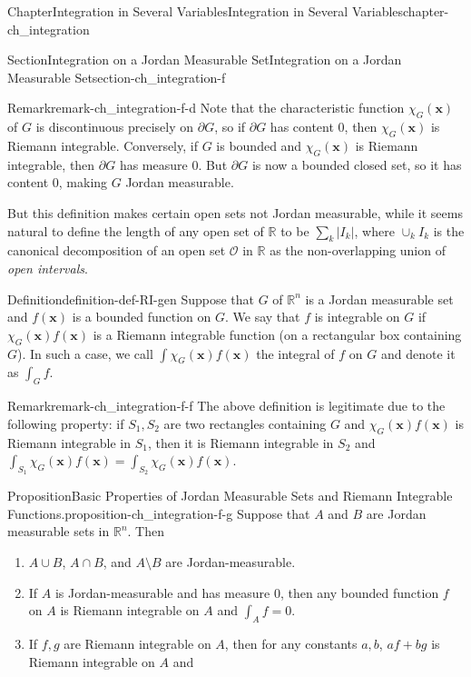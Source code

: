 \documentclass[oneside,10pt,]{book}
\numberwithin{equation}{section}
\newcommand{\bx}{\mathbf{x}}
\newcommand{\bbR}{\mathbb{R}}
\begin{document}
\begin{chapterptx}{Chapter}{Integration in Several Variables}{}{Integration in Several Variables}{}{}{chapter-ch_integration}
\begin{sectionptx}{Section}{Integration on a Jordan Measurable Set}{}{Integration on a Jordan Measurable Set}{}{}{section-ch_integration-f}
\begin{remark}{Remark}{}{remark-ch_integration-f-d}
Note that the characteristic function \(\chi_{G}(\bx)\) of \(G\) is discontinuous precisely on \(\partial G\), so if \(\partial G\) has content \(0\), then \(\chi_{G}(\bx)\) is Riemann integrable. Conversely, if  \(G\) is bounded and \(\chi_{G}(\bx)\) is Riemann integrable, then \(\partial G\) has measure \(0\). But \(\partial G\) is now a bounded closed set, so it has content \(0\), making \(G\) Jordan measurable.%
\par
But this definition makes certain open sets not Jordan measurable, while  it seems natural to define the length of any open set of \(\bbR\) to be \(\sum_{k}|I_{k}|\), where \(\cup_{k}I_{k}\) is the canonical decomposition of an open set \(\mathcal O\) in \(\mathbb R\) as the non-overlapping union of \emph{open intervals}.%
\end{remark}
\begin{definition}{Definition}{}{definition-def-RI-gen}%
Suppose that \(G\) of \(\bbR^{n}\) is  a  Jordan measurable set and \(f(\bx)\) is a bounded function on \(G\).  We say  that \(f\) is integrable on \(G\) if \(\chi_{G}(\bx)f(\bx)\) is a Riemann integrable function (on a rectangular box containing \(G\)). In such a case, we call \(\int \chi_{G}(\bx)f(\bx)\) the integral of \(f\) on \(G\) and denote it as \(\int_{G}f\).\end{definition}
\begin{remark}{Remark}{}{remark-ch_integration-f-f}%
The above definition is legitimate due to the following property: if \(S_{1}, S_{2}\) are two rectangles containing \(G\) and \(\chi_{G}(\bx)f(\bx)\) is  Riemann integrable in \(S_{1}\), then it is Riemann integrable in \(S_{2}\) and \(\int_{S_{1}} \chi_{G}(\bx)f(\bx)=\int_{S_{2}} \chi_{G}(\bx)f(\bx)\).\end{remark}
\begin{proposition}{Proposition}{Basic Properties of Jordan Measurable Sets and Riemann Integrable Functions.}{}{proposition-ch_integration-f-g}%
Suppose that \(A\) and \(B\) are Jordan measurable sets in \(\bbR^{n}\). Then %
\begin{enumerate}[label=(\alph*)]
\item{}\(A\cup B\), \(A\cap B\), and \(A\setminus B\) are Jordan-measurable.%
\item{}If \(A\) is Jordan-measurable and has measure \(0\), then  any bounded function \(f\) on \(A\) is Riemann integrable on \(A\) and \(\int_{A} f =0\).%
\item{}If \(f, g\) are Riemann integrable on \(A\), then for any constants \(a, b\), \(a f+b g\) is Riemann integrable on \(A\) and%

\end{enumerate}
\end{proposition}
\end{sectionptx}
\end{chapterptx}
\end{document}
